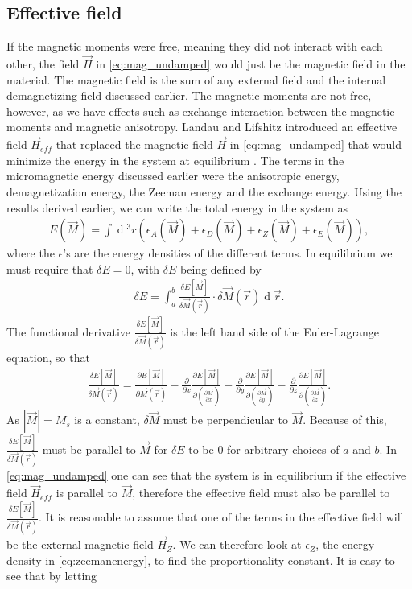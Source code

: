 \documentclass[12pt, a4paper]{article}		%
\renewcommand{\d}[1]{\ensuremath{\operatorname{d}\!{#1}}}
\numberwithin{equation}{section}
\begin{document}
\subsection{Effective field}
If the magnetic moments were free, meaning they did not interact with each other, the field $\vec{H}$ in \eqref{eq:mag_undamped} would just be the magnetic field in the material. The magnetic field is the sum of any external field and the internal demagnetizing field discussed earlier. The magnetic moments are not free, however, as we have effects such as exchange interaction between the magnetic moments and magnetic anisotropy. Landau and Lifshitz introduced an effective field $\vec{H}_{eff}$ that replaced the magnetic field $\vec{H}$ in \eqref{eq:mag_undamped} that would minimize the energy in the system at equilibrium \cite{LandauLifshitz1935}. The terms in the micromagnetic energy discussed earlier were the anisotropic energy, demagnetization energy, the Zeeman energy and the exchange energy. Using the results derived earlier, we can write the total energy in the system as
\begin{align}
\label{eq:micromagneticenergy}
E(\vec{M}) = \int \d {^3} r (\epsilon_A(\vec{M}) + \epsilon_D(\vec{M}) + \epsilon_Z(\vec{M}) + \epsilon_E(\vec{M})),
\end{align}
where the $\epsilon$'s are the energy densities of the different terms. In equilibrium we must require that $\delta E=0$, with $\delta E$ being defined by
\begin{align}
\label{eq:deltaE}
\delta E = \int_a^b \frac{\delta E[\vec{M}]}{\delta \vec{M}(\vec{r})}\cdot \delta \vec{M}(\vec{r}) \d {\vec{r}}.
\end{align}
The functional derivative $\frac{\delta E[\vec{M}]}{\delta \vec{M}(\vec{r})}$ is the left hand side of the Euler-Lagrange equation, so that
\begin{align}
\label{eq:functionaldiff}
\frac{\delta E[\vec{M}]}{\delta \vec{M}(\vec{r})} = \frac{\partial E[\vec{M}]}{\partial \vec{M}(\vec{r})} - \frac{\partial}{\partial x} \frac{\partial E[\vec{M}]}{\partial (\frac{\partial \vec{M}}{\partial x})} - \frac{\partial}{\partial y} \frac{\partial E[\vec{M}]}{\partial (\frac{\partial \vec{M}}{\partial y})} - \frac{\partial}{\partial z} \frac{\partial E[\vec{M}]}{\partial (\frac{\partial \vec{M}}{\partial z})}.
\end{align}
As $|\vec{M}| = M_s$ is a constant, $\delta \vec{M}$ must be perpendicular to $\vec{M}$. Because of this, $\frac{\delta E[\vec{M}]}{\delta \vec{M}(\vec{r})}$ must be parallel to $\vec{M}$ for $\delta E$ to be 0 for arbitrary choices of $a$ and $b$. In \eqref{eq:mag_undamped} one can see that the system is in equilibrium if the effective field $\vec{H}_{eff}$ is parallel to $\vec{M}$, therefore the effective field must also be parallel to $\frac{\delta E[\vec{M}]}{\delta \vec{M}(\vec{r})}$. It is reasonable to assume that one of the terms in the effective field will be the external magnetic field $\vec{H}_Z$. We can therefore look at $\epsilon_Z$, the energy density in \eqref{eq:zeemanenergy}, to find the proportionality constant. It is easy to see that by letting
\end{document}
